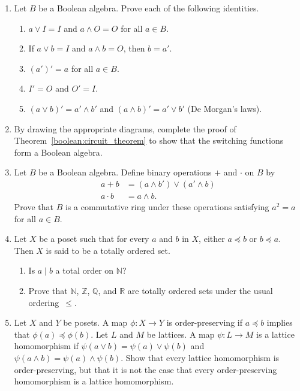 {\begin{enumerate}
 
\item
Let $B$ be a Boolean algebra. Prove each of the following identities.
\begin{enumerate}
 
 \item
$a \vee I = I$ and $a \wedge O = O$ for all $a \in B$. 
 
 \item
If $a \vee b = I$ and $a \wedge b = O$, then $b = a'$.
 
 \item
$(a')'=a$ for all $a \in B$.
 
 \item
$I' = O$ and $O' = I$.
 
 \item
$(a \vee b)' = a' \wedge b'$ and $(a \wedge b)' = a' \vee b'$ (De
Morgan's laws).
 
\end{enumerate}
 
 
\item 
By drawing the appropriate diagrams, complete the proof of
Theorem~\ref{boolean:circuit_theorem} to show that the switching functions form a Boolean
algebra. 
 
 
\item
Let $B$ be a Boolean algebra. Define binary operations $+$ and
$\cdot$ on $B$ by
\begin{align*}
a + b & = (a \wedge b') \vee (a' \wedge b) \\
a \cdot b & = a \wedge b.
\end{align*}
Prove that $B$ is a commutative ring under these operations
satisfying $a^2 = a$ for all $a \in B$.
 
 
\item
Let $X$  be a poset such that for every $a$ and $b$ in $X$, either $a
\preceq  b$ or $b \preceq a$. Then $X$ is said to be a {\bfi totally
ordered set}.
\begin{enumerate}			

 \item
Is $a \mid b$ a total order on ${\mathbb N}$?
 
 \item
Prove that ${\mathbb N}$, ${\mathbb Z}$, ${\mathbb Q}$, and ${\mathbb R}$ are
totally ordered sets under the usual ordering~$\leq$.
 
 
\end{enumerate}
 
 
\item
Let $X$ and $Y$ be posets.  A map $\phi : X \rightarrow Y$ is {\bfi
order-preserving\/} if $a \preceq b$
implies that $\phi(a) \preceq \phi(b)$.  Let $L$ and $M$ be lattices.
A map $\psi: L \rightarrow M$ is a {\bfi lattice
homomorphism\/}
if $\psi( a \vee b ) = \psi(a) \vee \psi(b)$ and $\psi( a \wedge b ) =
\psi(a) \wedge \psi(b)$. Show that every lattice homomorphism is
order-preserving, but that it is not the case that every
order-preserving homomorphism is a lattice homomorphism.  
 

\end{enumerate}}
